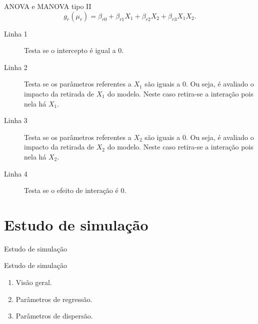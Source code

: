 \documentclass[
  ignorenonframetext,
  serif,
  professionalfont,
  usenames,
  dvipsnames,
  aspectratio = 169]{beamer}
\begin{document}
\begin{frame}{ANOVA e MANOVA tipo II}
\protect\hypertarget{anova-e-manova-tipo-ii}{}
\[
g_r(\mu_r) = \beta_{r0} + \beta_{r1} X_1 + \beta_{r2} X_2 + \beta_{r3} X_1X_2.
\]

\begin{description}
  
  \item[Linha 1] Testa se o intercepto é igual a 0.
  
  \item[Linha 2] Testa se os parâmetros referentes a $X_1$ são iguais a 0. Ou seja, é avaliado o impacto da retirada de $X_1$ do modelo. Neste caso retira-se a interação pois nela há $X_1$.
  
  \item[Linha 3] Testa se os parâmetros referentes a $X_2$ são iguais a 0. Ou seja, é avaliado o impacto da retirada de $X_2$ do modelo. Neste caso retira-se a interação pois nela há $X_2$.
  
  \item[Linha 4] Testa se o efeito de interação é 0.
  
\end{description}
\end{frame}

\hypertarget{estudo-de-simulauxe7uxe3o}{%
\section{Estudo de simulação}\label{estudo-de-simulauxe7uxe3o}}

\begin{frame}{Estudo de simulação}
\end{frame}

\begin{frame}{Estudo de simulação}
\protect\hypertarget{estudo-de-simulauxe7uxe3o-1}{}
\begin{enumerate}
    \itemsep 2ex
  
  \item Visão geral.
    
  \item Parâmetros de regressão.

  \item Parâmetros de dispersão.
 
\end{enumerate}
\end{frame}
\end{document}
